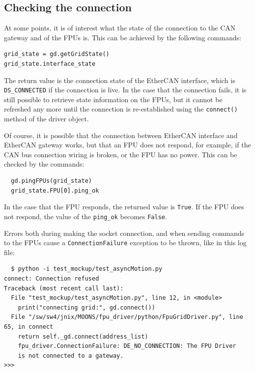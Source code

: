 \documentclass[11pt,a4paper]{report}
\begin{document}
\subsection{Checking the connection}
\begin{samepage}
At some points, it is of interest what the state of
the connection to the CAN gateway and of the FPUs is.
This can be achieved by the following commands:
\begin{verbatim}
grid_state = gd.getGridState()
grid_state.interface_state  
\end{verbatim}
The return value is the connection state of the EtherCAN interface, which is
\texttt{DS\_CONNECTED} if the connection is live.  In the case that the
connection fails, it is still possible to retrieve state information
on the FPUs, but it cannot be refreshed any more until the connection
is re-established using the \texttt{connect()} method of the driver
object.
\end{samepage}

 Of course, it is possible that the
connection between EtherCAN interface and EtherCAN gateway works, but that an FPU
does not respond, for example, if the CAN bus connection wiring is
broken, or the FPU has no power. This can be checked by the commands:

\begin{verbatim}
  gd.pingFPUs(grid_state)
  grid_state.FPU[0].ping_ok
\end{verbatim}

In the case that the FPU responds, the returned value is
\texttt{True}.  If the FPU does not respond, the value of the
\verb+ping_ok+ becomes \texttt{False}.

Errors both during making the socket connection, and when sending
commands to the FPUs cause a \texttt{ConnectionFailure} exception to
be thrown, like in this log file:

\begin{verbatim}
  $ python -i test_mockup/test_asyncMotion.py 
connect: Connection refused
Traceback (most recent call last):
  File "test_mockup/test_asyncMotion.py", line 12, in <module>
    print("connecting grid:", gd.connect())
  File "/sw/sw4/jnix/MOONS/fpu_driver/python/FpuGridDriver.py", line 65, in connect
    return self._gd.connect(address_list)
    fpu_driver.ConnectionFailure: DE_NO_CONNECTION: The FPU Driver
    is not connected to a gateway.
>>> 
\end{verbatim}
\end{document}

